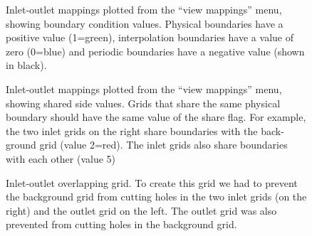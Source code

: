 \documentclass[xcolor=rgb,svgnames,dvipsnames]{article}
\newcommand{\figures}{\homeHenshaw/OvertureFigures}
\begin{document}
{
\newcommand{\figWidthd}{12cm}
\newcommand{\trimfig}[2]{\trimPlot{#1}{#2}{.0}{.0}{.125}{.3}}
\begin{figure}[hbt]
\begin{center}
\end{center}
  \caption{Inlet-outlet mappings plotted from the ``view mappings'' menu, 
          showing boundary condition values. Physical boundaries have a positive value (1=green),
         interpolation boundaries have a value of zero (0=blue) and periodic boundaries have a 
      negative value (shown in black). }  \label{fig:inletOutletBC}
\end{figure}
\begin{figure}[hbt]
\begin{center}
\end{center}
  \caption{Inlet-outlet mappings plotted from the ``view mappings'' menu, 
          showing shared side values. Grids that share the same physical boundary should
     have the same value of the share flag. For example, the two inlet grids on the right
     share boundaries with the back-ground grid (value 2=red). The inlet grids also share
      boundaries with each other (value 5) }  \label{fig:inletOutletShare}
\end{figure}
\begin{figure}[hbt]
\begin{center}
\end{center}
  \caption{Inlet-outlet overlapping grid. To create this grid we had to prevent the 
      background grid from cutting holes in the two inlet grids (on the right) and the
      outlet grid on the left. The outlet grid was also prevented from cutting holes in
      the background grid.}  \label{fig:inletOutlet}
\end{figure}
}
\end{document}
